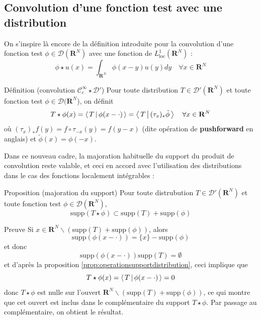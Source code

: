     \subsection{Convolution d’une fonction test avec une distribution}

        On s’inspire là encore de la définition introduite pour la convolution d’une fonction test $\phi \in \mathcal{D}(\mathbf{R}^N)$ avec une fonction de $L^1_{\text{loc}}(\mathbf{R}^N)$ :
        \[ \phi \star u(x) = \int_{\mathbf{R}^N} \phi(x-y)u(y)dy \quad \forall x \in\mathbf{R}^N \]

        \begin{omed}{Définition (convolution $\mathcal{C}_c^{\infty} \star \mathcal{D}'$)}
            Pour toute distribution $T \in \mathcal{D}'(\mathbf{R}^N)$ et toute fonction test $\phi \in \mathcal{D}(\mathbf{R}^N$), on définit 
            \[ T \star \phi(x) = \left< \, T \, \middle| \, \phi(x - \cdot) \, \right> = \left< \, T \, \middle| \, (\tau_x)_* \tilde{\phi} \, \right> \quad \forall x \in \mathbf{R}^N \]
            où $(\tau_x)_{*}f(y) = f \circ \tau_{-x}(y) = f(y - x)$ (dite opération de \textbf{pushforward} en anglais) et $\tilde{\phi}(x) = \phi(-x)$.
        \end{omed}

        Dans ce nouveau cadre, la majoration habituelle du support du produit de convolution reste valable, et ceci en accord avec l’utilisation des distributions dans le cas des fonctions localement intégrables :

        \begin{omed}{Proposition (majoration du support)}
            Pour toute distrubution $T \in \mathcal{D}'(\mathbf{R}^N)$ et toute fonction test $\phi \in \mathcal{D}(\mathbf{R}^N)$, 
            \[ \text{supp}(T \star \phi) \subset \text{supp}(T) + \text{supp}(\phi) \]   
        \end{omed}

        \begin{demo}{Preuve}
            Si $x \in \mathbf{R}^N \backslash \left(\text{supp}(T) + \text{supp}(\phi)\right)$, alors 
            \[ \text{supp}(\phi(x - \cdot)) = \{x\} - \text{supp}(\phi) \]   
            et donc 
            \[ \text{supp}(\phi(x - \cdot)) \text{supp}(T) = \emptyset \]   
            et d’après la proposition \ref{prop:operationsupportdistribution}, ceci implique que 
            \[ T \star \phi(x) = \left< \, T \, \middle| \, \phi(x - \cdot) \, \right> = 0 \]   
            donc $T \star \phi$ est nulle sur l’ouvert $\mathbf{R}^N \backslash \left(\text{supp}(T) + \text{supp}(\phi)\right)$, ce qui montre que cet ouvert est inclus dans le complémentaire du support $T \star \phi$. Par passage au complémentaire, on obtient le résultat.
        \end{demo}

